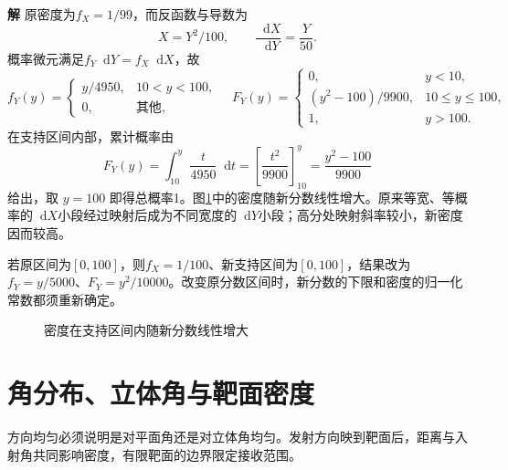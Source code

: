 \documentclass[11pt,openany,fontset=fandol]{ctexbook}
\theoremstyle{definition}\newtheorem{example}{例}[chapter]\newtheorem{exercise}{习题}[chapter]
\newcommand{\SolutionStart}{\par\medskip\ifdim\pagetotal>0pt\ifdim\dimexpr\pagegoal-\pagetotal\relax<3\baselineskip\newpage\fi\fi\noindent\textbf{解}\quad\ignorespaces}
\newenvironment{solution}{\SolutionStart}{\par\medskip}
\newcommand{\dd}{\mathop{}\!\mathrm d}\newcommand{\ee}{\mathrm e}\newcommand{\vct}[1]{\bm{#1}}
\begin{document}
\begin{solution}
原密度为$f_X=1/99$，而反函数与导数为
\[
 X=Y^2/100,\qquad\frac{\dd X}{\dd Y}=\frac Y{50}.
\]
概率微元满足$f_Y\dd Y=f_X\dd X$，故
\[
 f_Y(y)=\begin{cases}y/4950,&10<y<100,\\0,&\text{其他},\end{cases}
 \quad
 F_Y(y)=\begin{cases}0,&y<10,\\(y^2-100)/9900,&10\le y\le100,\\1,&y>100.\end{cases}
\]
在支持区间内部，累计概率由
\[
F_Y(y)=\int_{10}^y\frac{t}{4950}\dd t
=\left[\frac{t^2}{9900}\right]_{10}^y
=\frac{y^2-100}{9900}
\]
给出，取 $y=100$ 即得总概率1。图\ref{mp1:fig:rev:score-s}中的密度随新分数线性增大。原来等宽、等概率的$\dd X$小段经过映射后成为不同宽度的$\dd Y$小段；高分处映射斜率较小，新密度因而较高。

若原区间为$[0,100]$，则$f_X=1/100$、新支持区间为$[0,100]$，结果改为$f_Y=y/5000$、$F_Y=y^2/10000$。改变原分数区间时，新分数的下限和密度的归一化常数都须重新确定。

\begin{figure}[H]\centering
{}
\caption{密度在支持区间内随新分数线性增大}\label{mp1:fig:rev:score-s}
\end{figure}

\end{solution}

\section{角分布、立体角与靶面密度}
方向均匀必须说明是对平面角还是对立体角均匀。发射方向映到靶面后，距离与入射角共同影响密度，有限靶面的边界限定接收范围。
\end{document}
